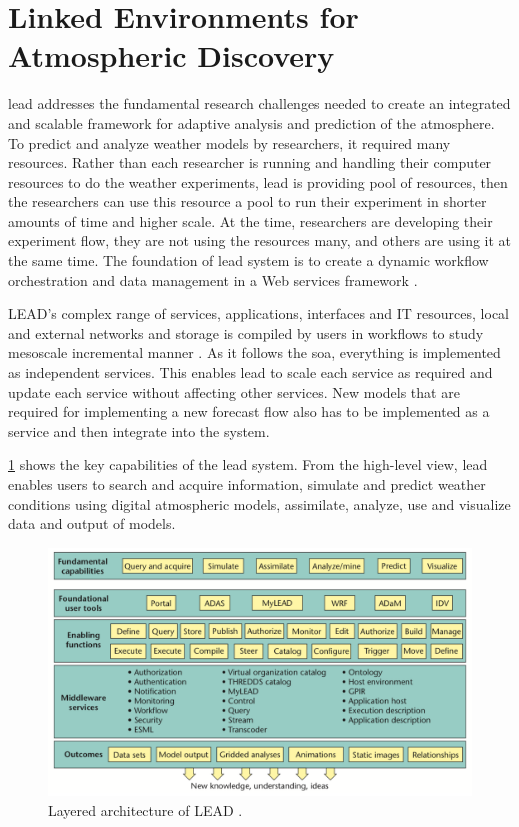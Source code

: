 \section{Linked Environments for Atmospheric Discovery}
\label{se:lead}

\acrfull{lead} \cite{Droegemeier2005Service-OrientedWeather} addresses the fundamental research challenges needed to create an integrated and scalable framework for adaptive analysis and prediction of the atmosphere. To predict and analyze weather models by researchers, it required many resources. Rather than each researcher is running and handling their computer resources to do the weather experiments, \acrshort{lead} is providing pool of resources, then the researchers can use this resource a pool to run their experiment in shorter amounts of time and higher scale. At the time, researchers are developing their experiment flow, they are not using the resources many, and others are using it at the same time. The foundation of \acrshort{lead} system is to create a dynamic workflow orchestration and data management in a Web services framework \cite{Droegemeier2005Service-OrientedWeather}.

LEAD's complex range of services, applications, interfaces and IT resources, local and external networks and storage is compiled by users in workflows to study mesoscale incremental manner \cite{Droegemeier2005Service-OrientedWeather}. As it follows the \acrshort{soa}, everything is implemented as independent services. This enables \acrshort{lead} to scale each service as required and update each service without affecting other services. New models that are required for implementing a new forecast flow also has to be implemented as a service and then integrate into the system.

\cref{fi:lead_system} shows the key capabilities of the \acrshort{lead} system. From the high-level view, \acrshort{lead} enables users to search and acquire information, simulate and predict weather conditions using digital atmospheric models, assimilate, analyze, use and visualize data and output of models.

\begin{figure}[htp]
    \centering
    \includegraphics[width=1.0\textwidth]{lit/lead/LEAD-system-Fundamental-capabilities-familiar-to-meteorologists-are-shown-in-the-top_W640.png}
    \caption[Layered architecture of LEAD]{Layered architecture of LEAD \cite{Droegemeier2005Service-OrientedWeather}.}
    \label{fi:lead_system}
\end{figure}

